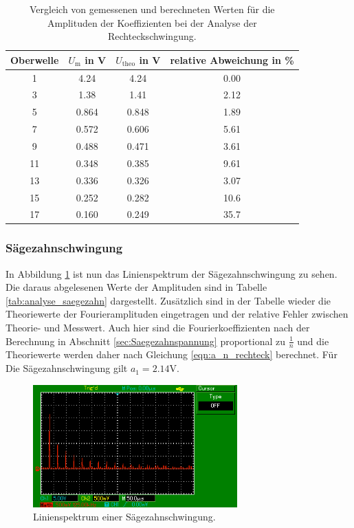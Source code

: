 \begin{table}
  \centering
  \begin{tabular}{c c c c}
    \toprule
    Oberwelle & $U_\text{m}$ in \si{\volt} & $U_\text{theo}$ in \si{\volt} &
    relative Abweichung in \% \\
    \midrule
    1  & 4.24  & 4.24  & 0.00 \\
    3  & 1.38  & 1.41  & 2.12 \\
    5  & 0.864 & 0.848 & 1.89 \\
    7  & 0.572 & 0.606 & 5.61 \\
    9  & 0.488 & 0.471 & 3.61 \\
    11 & 0.348 & 0.385 & 9.61 \\
    13 & 0.336 & 0.326 & 3.07 \\
    15 & 0.252 & 0.282 & 10.6 \\
    17 & 0.160 & 0.249 & 35.7 \\
    \bottomrule
  \end{tabular}
  \caption{Vergleich von gemessenen und berechneten Werten für die Amplituden
    der Koeffizienten bei der Analyse der Rechteckschwingung.}
  \label{tab:analyse_rechteck}
\end{table}

\subsubsection{Sägezahnschwingung}
In Abbildung \ref{fig:linienspektrum_saegezahn} ist nun das Linienspektrum der
Sägezahnschwingung zu sehen. Die daraus abgelesenen Werte der Amplituden sind in
Tabelle \ref{tab:analyse_saegezahn} dargestellt. Zusätzlich sind in der Tabelle
wieder die Theoriewerte der Fourieramplituden eingetragen und der relative Fehler
zwischen Theorie- und Messwert.
Auch hier sind die Fourierkoeffizienten nach der Berechnung in Abschnitt \ref{sec:Saegezahnspannung}
proportional zu $\frac{1}{n}$ und die Theoriewerte werden daher nach Gleichung
\eqref{eqn:a_n_rechteck} berechnet. Für Die Sägezahnschwingung gilt $a_1 = 2.14
\si{\volt}$.

\begin{figure}
  \centering
  \includegraphics[width=0.7\textwidth]{linienspektrum_saegezahn.png}
  \caption{Linienspektrum einer Sägezahnschwingung.}
  \label{fig:linienspektrum_saegezahn}
\end{figure}

